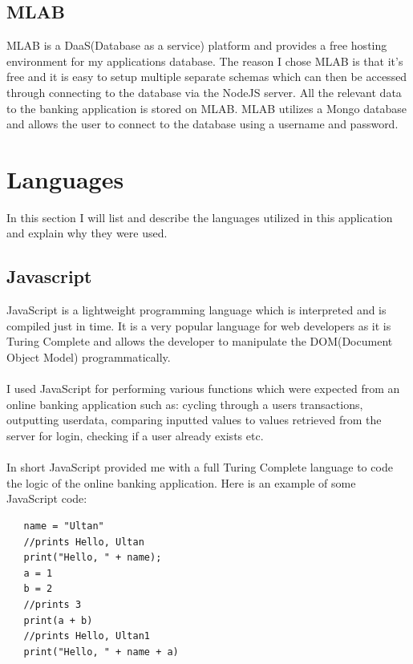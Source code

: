 \subsection{MLAB}
MLAB is a DaaS(Database as a service) platform and provides a free hosting environment for my applications database\cite{MLAB}.  The reason I chose MLAB is that it's free and it is easy to setup multiple separate schemas which can then be accessed through connecting to the database via the NodeJS server.  All the relevant data to the banking application is stored on MLAB.  MLAB utilizes a Mongo database and allows the user to connect to the database using a username and password.
\section{Languages}
In this section I will list and describe the languages utilized in this application and explain why they were used.
\subsection{Javascript}
JavaScript is a lightweight programming language which is interpreted and is compiled just in time\cite{JavaScript}.  It is a very popular language for web developers as it is Turing Complete and allows the developer to manipulate the DOM(Document Object Model) programmatically.
\\
\\
 I used JavaScript for performing various functions which were expected from an online banking application such as: cycling through a users transactions, outputting userdata, comparing inputted values to values retrieved from the server for login, checking if a user already exists etc.
 \\
 \\
 In short JavaScript provided me with a full Turing Complete language to code the logic of the online banking application. Here is an example of some JavaScript code:
 \begin{verbatim}
   name = "Ultan"
   //prints Hello, Ultan
   print("Hello, " + name);
   a = 1
   b = 2
   //prints 3
   print(a + b)
   //prints Hello, Ultan1
   print("Hello, " + name + a)

 \end{verbatim}
